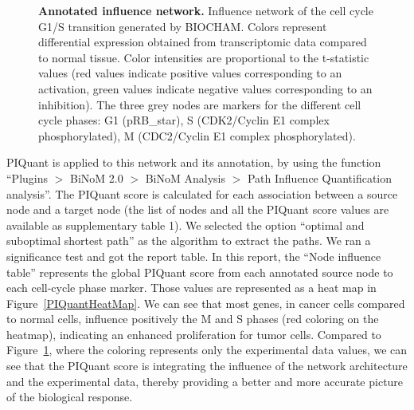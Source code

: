\documentclass[10pt]{bmc_article}
\newenvironment{bmcformat}{\baselineskip20pt\sloppy\setboolean{publ}{false}}{\baselineskip20pt\sloppy}
\begin{document}
\begin{bmcformat}
\begin{figure}[h]
  \caption{\label{InflAnnotNet} \textbf{Annotated influence network.}
    Influence network of the cell cycle G1/S transition generated by BIOCHAM. Colors represent
differential
expression obtained from transcriptomic data compared to normal tissue. Color 
intensities are proportional to the t-statistic values (red values indicate
positive values corresponding to an activation, green values indicate negative
values corresponding to an inhibition). The three grey nodes are markers for the
different cell cycle phases: G1 (pRB\_star), S (CDK2/Cyclin E1 complex phosphorylated), M (CDC2/Cyclin E1 complex phosphorylated).}
\end{figure}

PIQuant is applied to this network and its annotation, by using the function
``Plugins $>$ BiNoM 2.0 $>$ BiNoM Analysis $>$ Path Influence Quantification
analysis''. The PIQuant score is calculated for each association
between a source node and a target node (the list of nodes and all the PIQuant
score values are available as supplementary table 1). We selected the option ``optimal and
suboptimal shortest path'' as the algorithm to extract the paths. We ran a
significance test and got the report table. In this report, the ``Node influence
table'' represents the global PIQuant score from each annotated source node to
each cell-cycle phase marker. Those values are
represented as a heat map in Figure~\ref{PIQuantHeatMap}. We can see that most
genes, in cancer cells compared to normal cells, influence positively the M and S phases (red
coloring on the heatmap), indicating an enhanced proliferation for tumor cells.
Compared to Figure~\ref{InflAnnotNet}, where the coloring represents only the
experimental data values, we can see that the PIQuant score is integrating the
influence of the network architecture and the experimental data, thereby
providing a better and more accurate picture of the biological response.



\end{bmcformat}
\end{document}
